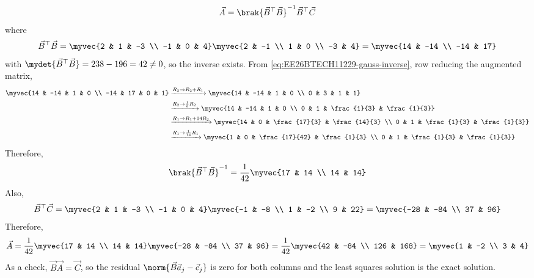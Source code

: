 \begin{enumerate}[label=\thesubsection.\arabic*, ref=\thesubsection.\theenumi]
\begin{align}
	\vec{A} = \brak{\vec{B}^{\top}\vec{B}}^{-1}\vec{B}^{\top}\vec{C}
\end{align}
where
\begin{align}
	\vec{B}^{\top}\vec{B} = \myvec{2 & 1 & -3 \\ -1 & 0 & 4}\myvec{2 & -1 \\ 1 & 0 \\ -3 & 4} = \myvec{14 & -14 \\ -14 & 17}
\end{align}
with $\mydet{\vec{B}^{\top}\vec{B}} = 238 - 196 = 42 \neq 0$, so the inverse exists. From \eqref{eq:EE26BTECH11229-gauss-inverse}, row reducing the augmented matrix,
\begin{align}
	\myvec{14 & -14 & 1 & 0 \\ -14 & 17 & 0 & 1}
	&\xrightarrow{R_2 \to R_2 + R_1}
	\myvec{14 & -14 & 1 & 0 \\ 0 & 3 & 1 & 1}
	\nonumber \\
	&\xrightarrow{R_2 \to \frac{1}{3}R_2}
	\myvec{14 & -14 & 1 & 0 \\ 0 & 1 & \frac{1}{3} & \frac{1}{3}}
	\nonumber \\
	&\xrightarrow{R_1 \to R_1 + 14R_2}
	\myvec{14 & 0 & \frac{17}{3} & \frac{14}{3} \\ 0 & 1 & \frac{1}{3} & \frac{1}{3}}
	\nonumber \\
	&\xrightarrow{R_1 \to \frac{1}{14}R_1}
	\myvec{1 & 0 & \frac{17}{42} & \frac{1}{3} \\ 0 & 1 & \frac{1}{3} & \frac{1}{3}}
\end{align}
Therefore,
\begin{align}
	\brak{\vec{B}^{\top}\vec{B}}^{-1} = \frac{1}{42}\myvec{17 & 14 \\ 14 & 14}
\end{align}
Also,
\begin{align}
	\vec{B}^{\top}\vec{C} = \myvec{2 & 1 & -3 \\ -1 & 0 & 4}\myvec{-1 & -8 \\ 1 & -2 \\ 9 & 22} = \myvec{-28 & -84 \\ 37 & 96}
\end{align}
Therefore,
\begin{align}
	\vec{A} = \frac{1}{42}\myvec{17 & 14 \\ 14 & 14}\myvec{-28 & -84 \\ 37 & 96} = \frac{1}{42}\myvec{42 & -84 \\ 126 & 168}
	= \myvec{1 & -2 \\ 3 & 4}
\end{align}
As a check, $\vec{B}\vec{A} = \vec{C}$, so the residual $\norm{\vec{B}\vec{a}_j - \vec{c}_j}$ is zero for both columns and the least squares solution is the exact solution.


\end{enumerate}
